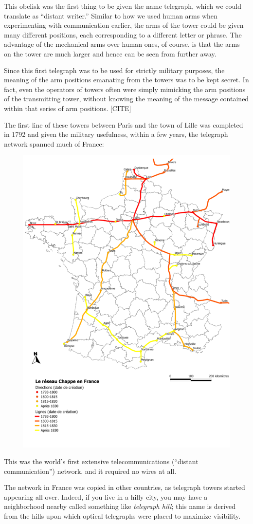 \documentclass{book}
\begin{document}
This obelisk was the first thing to be given the name telegraph, which we could translate as ``distant writer.'' Similar to how we used human arms when experimenting with communication earlier, the arms of the tower could be given many different positions, each corresponding to a different letter or phrase. The advantage of the mechanical arms over human ones, of course, is that the arms on the tower are much larger and hence can be seen from further away.

Since this first telegraph was to be used for strictly military purposes, the meaning of the arm positions emanating from the towers was to be kept secret. In fact, even the operators of towers often were simply mimicking the arm positions of the transmitting tower, without knowing the meaning of the message contained within that series of arm positions. [CITE]

The first line of these towers between Paris and the town of Lille was completed in 1792 and given the military usefulness, within a few years, the telegraph network spanned much of France:

\begin{figure}[H]
\centering
\includegraphics[width=0.5\linewidth]{chappe_network}
\end{figure}

This was the world's first extensive telecommunications (``distant communication'') network, and it required no wires at all.

The network in France was copied in other countries, as telegraph towers started appearing all over. Indeed, if you live in a hilly city, you may have a neighborhood nearby called something like \emph{telegraph hill}; this name is derived from the hills upon which optical telegraphs were placed to maximize visibility.
\end{document}
